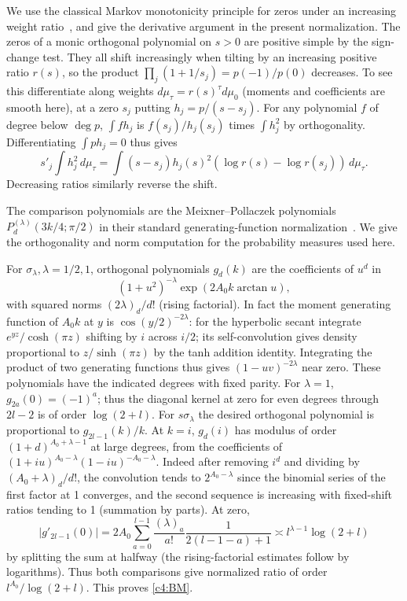 We use the classical Markov monotonicity principle for zeros under an increasing weight ratio~\cite{Markoff1886}, and give the derivative argument in the present normalization. The zeros of a monic orthogonal polynomial on \(s>0\) are positive simple by the sign-change test. They all shift increasingly when tilting by an increasing positive ratio \(r(s)\), so the product \(\prod_j(1+1/s_j)=p(-1)/p(0)\) decreases. To see this differentiate along weights \(d\mu_\tau=r(s)^\tau d\mu_0\) (moments and coefficients are smooth here), at a zero \(s_j\) putting \(h_j=p/(s-s_j)\). For any polynomial \(f\) of degree below \(\deg p\), \(\int f h_j\) is \(f(s_j)/h_j(s_j)\) times \(\int h_j^2\) by orthogonality. Differentiating \(\int p h_j=0\) thus gives
\[
 s'_j \int h_j^2\,d\mu_\tau
   =\int (s-s_j)h_j(s)^2(\log r(s)-\log r(s_j))\,d\mu_\tau .
\]
Decreasing ratios similarly reverse the shift.

The comparison polynomials are the Meixner--Pollaczek polynomials $P_d^{(\lambda)}(3k/4;\pi/2)$ in their standard generating-function normalization~\cite[Equation~18.23.7]{DLMF}. We give the orthogonality and norm computation for the probability measures used here.

For \(\sigma_\lambda,\lambda=1/2,1\), orthogonal polynomials \(g_d(k)\) are the coefficients of \(u^d\) in
\[
 (1+u^2)^{-\lambda}\exp(2A_0 k\arctan u),
\]
with squared norms \((2\lambda)_d/d!\) (rising factorial). In fact the moment generating function of \(A_0 k\) at \(y\) is \(\cos(y/2)^{-2\lambda}\): for the hyperbolic secant integrate \(e^{yz}/\cosh(\pi z)\) shifting by \(i\) across \(i/2\); its self-convolution gives density proportional to \(z/\sinh(\pi z)\) by the tanh addition identity. Integrating the product of two generating functions thus gives \((1-uv)^{-2\lambda}\) near zero. These polynomials have the indicated degrees with fixed parity. For \(\lambda=1\), \(g_{2a}(0)=(-1)^a\); thus the diagonal kernel at zero for even degrees through \(2l-2\) is of order \(\log(2+l)\). For \(s\sigma_\lambda\) the desired orthogonal polynomial is proportional to \(g_{2l-1}(k)/k\). At \(k=i\), \(g_d(i)\) has modulus of order \((1+d)^{A_0+\lambda-1}\) at large degrees, from the coefficients of \((1+iu)^{A_0-\lambda}(1-iu)^{-A_0-\lambda}\). Indeed after removing \(i^d\) and dividing by \((A_0+\lambda)_d/d!\), the convolution tends to \(2^{A_0-\lambda}\) since the binomial series of the first factor at 1 converges, and the second sequence is increasing with fixed-shift ratios tending to 1 (summation by parts). At zero,
\[
 |g'_{2l-1}(0)|=2A_0\sum_{a=0}^{l-1}
        \frac{(\lambda)_a}{a!}\frac1{2(l-1-a)+1}
       \asymp l^{\lambda-1}\log(2+l)
\]
by splitting the sum at halfway (the rising-factorial estimates follow by logarithms). Thus both comparisons give normalized ratio of order \(l^{A_0}/\log(2+l)\). This proves \eqref{c4:BM}.

